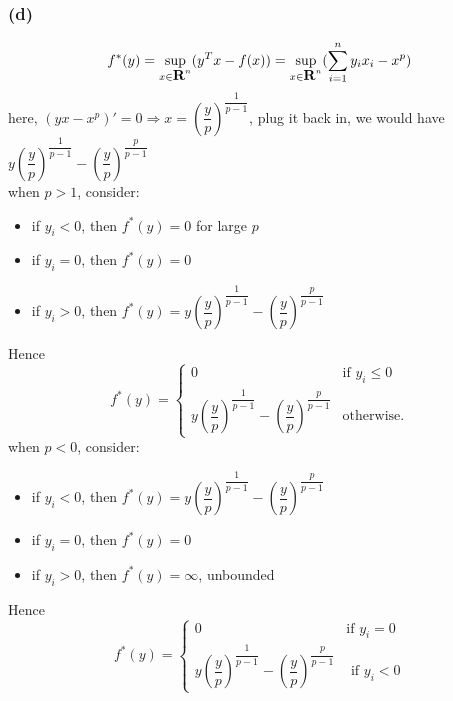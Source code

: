 \documentclass{article}
\newcommand{\reals}{{\mbox{\bf R}}}
\begin{document}
\subsubsection*{(d)}
\[f^*(y) = \sup_{x \in \reals^n} (y^Tx - f(x))  = \sup_{x \in \reals^n} (\sum_{i=1}^ny_ix_i - x^p)\]
here, $(yx - x^p)' = 0 \Rightarrow x = (\dfrac{y}{p})^{\dfrac{1}{p-1}}$, plug it back in, we would have $y(\dfrac{y}{p})^{\dfrac{1}{p-1}} - (\dfrac{y}{p})^{\dfrac{p}{p-1}}$\\
when $p >1$, consider:
\begin{itemize}
\item if $y_i < 0$, then $f^{*}(y)  = 0$ for large $p$
\item if $y_i = 0$, then $f^{*}(y)  = 0$
\item if $y_i > 0$, then  $f^{*}(y)  = y(\dfrac{y}{p})^{\dfrac{1}{p-1}} - (\dfrac{y}{p})^{\dfrac{p}{p-1}}$
\end{itemize}
Hence
\[  f^{*}(y) = \begin{cases}
            0 & \mbox{if } y_i \le  0 \\
            y(\dfrac{y}{p})^{\dfrac{1}{p-1}} - (\dfrac{y}{p})^{\dfrac{p}{p-1}} &  \mbox{otherwise.}
        \end{cases}\]
when $p < 0$, consider: 
\begin{itemize}
\item if $y_i < 0$, then  $f^{*}(y)  = y(\dfrac{y}{p})^{\dfrac{1}{p-1}} - (\dfrac{y}{p})^{\dfrac{p}{p-1}}$
\item if $y_i = 0$, then $f^{*}(y)  = 0$
\item if $y_i > 0$, then $f^{*}(y)  = \infty$, unbounded
\end{itemize}
Hence
\[  f^{*}(y) = \begin{cases}
            0 & \mbox{if } y_i =  0 \\
            y(\dfrac{y}{p})^{\dfrac{1}{p-1}} - (\dfrac{y}{p})^{\dfrac{p}{p-1}} &  \mbox{ if } y_i < 0
        \end{cases}\]




\end{document}
